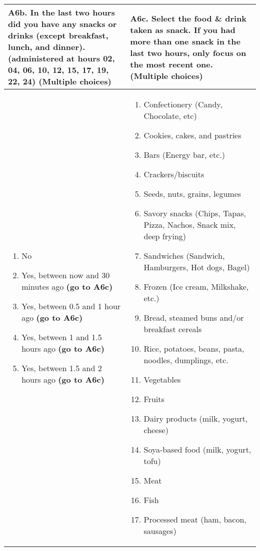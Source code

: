 \begin{tabularx}{0.97\textwidth}{XX}
    \toprule
    \textbf{A6b. In the last two hours did you have any snacks or drinks (except breakfast, lunch, and dinner).} (administered at hours 02, 04, 06, 10, 12, 15, 17, 19, 22, 24) (Multiple choices) &
    \textbf{A6c. Select the food \& drink taken as snack. If you had more than one snack in the last two hours, only focus on the most recent one.} (Multiple choices)\\
    \midrule
    \begin{enumerate}[leftmargin=*]
        \item No
        \item Yes, between now and 30 minutes ago \textbf{(go to A6c)}
        \item Yes, between 0.5 and 1 hour ago \textbf{(go to A6c)}
        \item Yes, between 1 and 1.5 hours ago \textbf{(go to A6c)}
        \item Yes, between 1.5 and 2 hours ago \textbf{(go to A6c)}
    \end{enumerate}&
    \begin{enumerate}[leftmargin=*]
        \item Confectionery (Candy, Chocolate, etc)
        \item Cookies, cakes, and pastries
        \item Bars (Energy bar, etc.)
        \item Crackers/biscuits
        \item Seeds, nuts, grains, legumes
        \item Savory snacks (Chips, Tapas, Pizza, Nachos, Snack mix, deep frying)
        \item Sandwiches (Sandwich, Hamburgers, Hot dogs, Bagel)
        \item Frozen (Ice cream, Milkshake, etc.)
        \item Bread, steamed buns and/or breakfast cereals
        \item Rice, potatoes, beans, pasta, noodles,
        dumplings, etc.
        \item Vegetables
        \item Fruits
        \item Dairy products (milk, yogurt, cheese)
        \item Soya-based food (milk, yogurt, tofu)
        \item Meat
        \item Fish
        \item Processed meat (ham, bacon, sausages)

\end{enumerate}
\end{tabularx}
